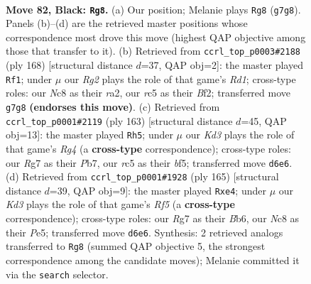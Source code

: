 \documentclass[11pt]{article}
\begin{document}
\clearpage

\begin{figure}[p]\centering
\begin{subfigure}{0.46\textwidth}\centering
\resizebox{\linewidth}{!}{%
\newchessgame
\chessboard[
  setfen={2n5/6r1/P2k4/2R5/3K4/2pB2PP/2P5/8 b - - 4 82},
  showmover=false,
  pgfstyle=straightmove, color=movearrow, markmove={g7-g8}
]}
\caption{}
\end{subfigure}\hfill
\begin{subfigure}{0.46\textwidth}\centering
\resizebox{\linewidth}{!}{%
\newchessgame
\chessboard[
  setfen={8/8/8/4pk2/4Nb2/5P1K/r4B1p/3R4 w - - 38 85},
  showmover=false,
  pgfstyle=straightmove, color=movearrow, markmove={d1-f1}
]}
\caption{}
\end{subfigure}
\\[4pt]
\begin{subfigure}{0.46\textwidth}\centering
\resizebox{\linewidth}{!}{%
\newchessgame
\chessboard[
  setfen={8/1p4kP/8/5Br1/p3p3/P3N3/1P3K2/8 b - - 8 82},
  showmover=false,
  pgfstyle=straightmove, color=movearrow, markmove={g5-h5}
]}
\caption{}
\end{subfigure}\hfill
\begin{subfigure}{0.46\textwidth}\centering
\resizebox{\linewidth}{!}{%
\newchessgame
\chessboard[
  setfen={8/p5k1/Pb6/4p2R/4PrB1/6KP/8/8 b - - 3 83},
  showmover=false,
  pgfstyle=straightmove, color=movearrow, markmove={f4-e4}
]}
\caption{}
\end{subfigure}
\caption{\textbf{Move 82, Black: \texttt{Rg8}.} (a) Our position; Melanie plays \texttt{Rg8} (\texttt{g7g8}). Panels (b)--(d) are the retrieved master positions whose correspondence most drove this move (highest QAP objective among those that transfer to it). (b) Retrieved from \texttt{ccrl\_top\_p0003\#2188} (ply 168) [structural distance $d$=37, QAP obj=2]: the master played \texttt{Rf1}; under $\mu$ our \emph{Rg2} plays the role of that game's \emph{Rd1}; cross-type roles: our \emph{N}c8 as their \emph{r}a2, our \emph{r}c5 as their \emph{B}f2; transferred move \texttt{g7g8} \textbf{(endorses this move)}. (c) Retrieved from \texttt{ccrl\_top\_p0001\#2119} (ply 163) [structural distance $d$=45, QAP obj=13]: the master played \texttt{Rh5}; under $\mu$ our \emph{Kd3} plays the role of that game's \emph{Rg4} (a \textbf{cross-type} correspondence); cross-type roles: our \emph{R}g7 as their \emph{P}b7, our \emph{r}c5 as their \emph{b}f5; transferred move \texttt{d6e6}. (d) Retrieved from \texttt{ccrl\_top\_p0001\#1928} (ply 165) [structural distance $d$=39, QAP obj=9]: the master played \texttt{Rxe4}; under $\mu$ our \emph{Kd3} plays the role of that game's \emph{Rf5} (a \textbf{cross-type} correspondence); cross-type roles: our \emph{R}g7 as their \emph{B}b6, our \emph{N}c8 as their \emph{P}e5; transferred move \texttt{d6e6}. Synthesis: 2 retrieved analogs transferred to \texttt{Rg8} (summed QAP objective 5, the strongest correspondence among the candidate moves); Melanie committed it via the \texttt{search} selector.}
\label{fig:thought-m163}
\end{figure}
\end{document}
